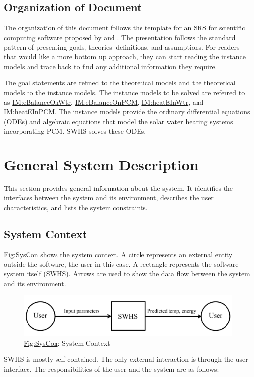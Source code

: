 \documentclass[12pt]{article}
\begin{document}
\subsection{Organization of Document}
\label{Sec:DocOrg}
The organization of this document follows the template for an SRS for scientific computing software proposed by \cite{koothoor2013} and \cite{smithLai2005}. The presentation follows the standard pattern of presenting goals, theories, definitions, and assumptions. For readers that would like a more bottom up approach, they can start reading the \hyperref[Sec:IMs]{instance models} and trace back to find any additional information they require.

The \hyperref[Sec:GoalStmt]{goal statements} are refined to the theoretical models and the \hyperref[Sec:TMs]{theoretical models} to the \hyperref[Sec:IMs]{instance models}. The instance models to be solved are referred to as \hyperref[IM:eBalanceOnWtr]{IM:eBalanceOnWtr}, \hyperref[IM:eBalanceOnPCM]{IM:eBalanceOnPCM}, \hyperref[IM:heatEInWtr]{IM:heatEInWtr}, and \hyperref[IM:heatEInPCM]{IM:heatEInPCM}. The instance models provide the ordinary differential equations (ODEs) and algebraic equations that model the solar water heating systems incorporating PCM. SWHS solves these ODEs.

\section{General System Description}
\label{Sec:GenSysDesc}
This section provides general information about the system. It identifies the interfaces between the system and its environment, describes the user characteristics, and lists the system constraints.

\subsection{System Context}
\label{Sec:SysContext}
\hyperref[Figure:SysCon]{Fig:SysCon} shows the system context. A circle represents an external entity outside the software, the user in this case. A rectangle represents the software system itself (SWHS). Arrows are used to show the data flow between the system and its environment.

\begin{figure}
\begin{center}
\includegraphics[width=\textwidth]{../../../../datafiles/swhs/SystemContextFigure.png}
\caption{\hyperref[Figure:SysCon]{Fig:SysCon}: System Context}
\label{Figure:SysCon}
\end{center}
\end{figure}
SWHS is mostly self-contained. The only external interaction is through the user interface. The responsibilities of the user and the system are as follows:
\end{document}
